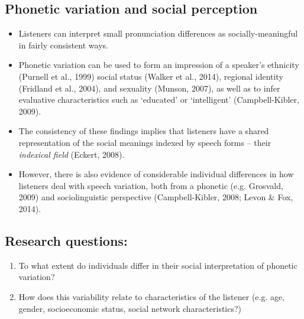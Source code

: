 \documentclass[a0,final]{a0poster}
\begin{document}
\begin{multicols}{4}							%
\raggedcolumns							%

\section*{Phonetic variation and social perception}
\begin{itemize}

\item{Listeners can interpret small pronunciation differences as socially-meaningful in fairly consistent ways.} 

\item{Phonetic variation can be used to form an impression of a speaker's ethnicity (Purnell et al., 1999) social status (Walker et al., 2014), regional identity (Fridland et al., 2004), and sexuality (Munson, 2007), as well as to infer evaluative characteristics such as `educated' or `intelligent' (Campbell-Kibler, 2009).}

\item{The consistency of these findings implies that listeners have a shared
representation of the social meanings indexed by speech forms -- their
\textit{indexical field} (Eckert, 2008).}

\item{However, there is also evidence of considerable individual differences in how listeners deal with speech variation, both from a phonetic (e.g. Grosvald, 2009) and sociolinguistic perspective (Campbell-Kibler, 2008; Levon \& Fox, 2014).}


\end{itemize}
\vspace*{-1cm}
\subsection*{Research questions:}
\begin{enumerate}
\item{To what extent do individuals differ in their social interpretation of phonetic variation?}

\item{How does this variability relate to characteristics of the listener (e.g. age, gender, socioeconomic status, social network characteristics?)}
\end{enumerate}
\vspace*{-1cm}




\end{multicols}
\end{document}
